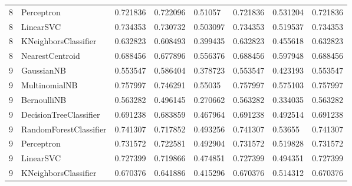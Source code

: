 \documentclass{article}
\begin{document}
\begin{table}[h]
\begin{tabular}{llllllll}
8             & Perceptron             & 0.721836          & 0.722096          & 0.51057               & 0.721836              & 0.531204                 & 0.721836                 \\
8             & LinearSVC              & 0.734353          & 0.730732          & 0.503097              & 0.734353              & 0.519537                 & 0.734353                 \\
8             & KNeighborsClassifier   & 0.632823          & 0.608493          & 0.399435              & 0.632823              & 0.455618                 & 0.632823                 \\
8             & NearestCentroid        & 0.688456          & 0.677896          & 0.556376              & 0.688456              & 0.597948                 & 0.688456                 \\
9             & GaussianNB             & 0.553547          & 0.586404          & 0.378723              & 0.553547              & 0.423193                 & 0.553547                 \\
9             & MultinomialNB          & 0.757997          & 0.746291          & 0.55035               & 0.757997              & 0.575103                 & 0.757997                 \\
9             & BernoulliNB            & 0.563282          & 0.496145          & 0.270662              & 0.563282              & 0.334035                 & 0.563282                 \\
9             & DecisionTreeClassifier & 0.691238          & 0.683859          & 0.467964              & 0.691238              & 0.492514                 & 0.691238                 \\
9             & RandomForestClassifier & 0.741307          & 0.717852          & 0.493256              & 0.741307              & 0.53655                  & 0.741307                 \\
9             & Perceptron             & 0.731572          & 0.722581          & 0.492904              & 0.731572              & 0.519828                 & 0.731572                 \\
9             & LinearSVC              & 0.727399          & 0.719866          & 0.474851              & 0.727399              & 0.494351                 & 0.727399                 \\
9             & KNeighborsClassifier   & 0.670376          & 0.641886          & 0.415296              & 0.670376              & 0.514312                 & 0.670376                 \\

\end{tabular}
\end{table}
\end{document}
